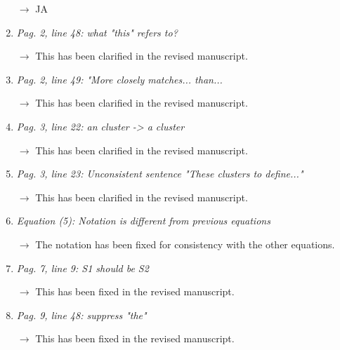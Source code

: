 \documentclass[10pt]{article}
\begin{document}
\begin{enumerate}
$\rightarrow$ JA

\item \emph{Pag. 2, line 48: what "this" refers to?}

$\rightarrow$
This has been clarified in the revised manuscript.

\item \emph{Pag. 2, line 49: "More closely matches... than...}

$\rightarrow$
This has been clarified in the revised manuscript.

\item \emph{Pag. 3, line 22: an cluster -\textgreater{} a cluster}

$\rightarrow$
This has been clarified in the revised manuscript.

\item \emph{Pag. 3, line 23: Unconsistent sentence "These clusters to define..."}

$\rightarrow$
This has been clarified in the revised manuscript.

\item \emph{Equation (5): Notation is different from previous equations}

$\rightarrow$
The notation has been fixed for consistency with the other equations.

\item \emph{Pag. 7, line 9: S1 should be S2}

$\rightarrow$
This has been fixed in the revised manuscript.

\item \emph{Pag. 9, line 48: suppress "the"}

$\rightarrow$
This has been fixed in the revised manuscript.

\end{enumerate}
\end{document}
